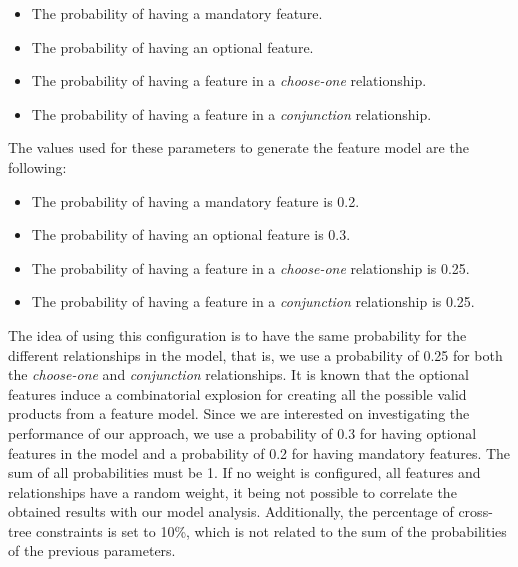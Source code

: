 \begin{itemize}
	\item The probability of having a mandatory feature.
	\item The probability of having an optional feature.
	\item The probability of having a feature in a \emph{choose-one} relationship.
	\item The probability of having a feature in a \emph{conjunction} relationship.
\end{itemize}

The values used for these parameters to generate the feature model are the following:

\begin{itemize}
        \item The probability of having a mandatory feature is 0.2.
        \item The probability of having an optional feature is 0.3.
        \item The probability of having a feature in a \emph{choose-one} relationship is 0.25.
        \item The probability of having a feature in a \emph{conjunction} relationship is 0.25.
\end{itemize}


The idea of using this configuration is to have the same probability for the different 
relationships in the model, that is, we use a probability of 0.25 for both the
\emph{choose-one} and \emph{conjunction} relationships.
It is known that the optional features induce a  combinatorial explosion for creating
all the possible valid products from a feature model. Since we are interested on investigating
the performance of our approach, we use a probability of 0.3 for having optional features in 
the model and a probability of 0.2 for having mandatory features.
The sum of all probabilities must be 1. If no weight is configured, all features and 
relationships have a random weight, it being not possible to correlate the obtained results with 
our model analysis.
Additionally, the percentage of cross-tree constraints is set to 10\%, which is not related to
the sum of the probabilities of the previous parameters.

